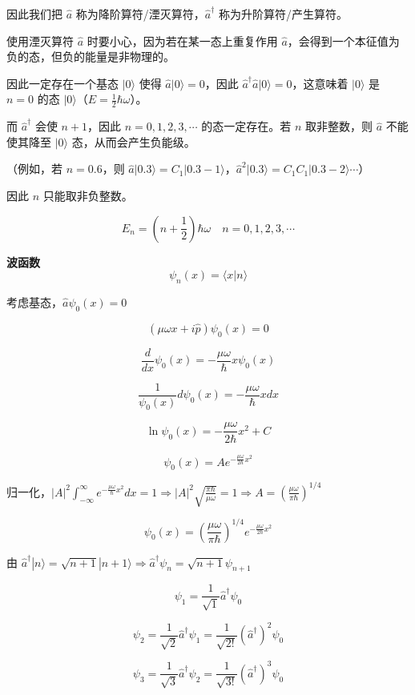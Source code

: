 \documentclass[lang=cn,10pt]{elegantbook}
\begin{document}
因此我们把 \(\hat{a}\) 称为降阶算符/湮灭算符，\(\hat{a}^\dagger\) 称为升阶算符/产生算符。

使用湮灭算符 \(\hat{a}\) 时要小心，因为若在某一态上重复作用 \(\hat{a}\)，会得到一个本征值为负的态，但负的能量是非物理的。

因此一定存在一个基态 \(|0\rangle\) 使得 \(\hat{a} |0\rangle = 0\)，因此 \(\hat{a}^\dagger \hat{a} |0\rangle = 0\)，这意味着 \(|0\rangle\) 是 \(n=0\) 的态 \(|0\rangle\)（\(E = \frac{1}{2}\hbar \omega\)）。

而 \(\hat{a}^\dagger\) 会使 \(n+1\)，因此 \(n=0, 1, 2, 3, \cdots\) 的态一定存在。若 \(n\) 取非整数，则 \(\hat{a}\) 不能使其降至 \(|0\rangle\) 态，从而会产生负能级。

（例如，若 \(n=0.6\)，则 \(\hat{a} |0.3\rangle = C_1 |0.3-1\rangle\)，\(\hat{a}^2 |0.3\rangle = C_1 C_1 |0.3-2\rangle \cdots\)）

因此 \(n\) 只能取非负整数。

\[
E_n = \left( n + \frac{1}{2} \right) \hbar \omega \quad n = 0, 1, 2, 3, \cdots
\]

\textbf{波函数}
\[
\psi_n(x) = \langle x | n \rangle
\]

考虑基态，\(\hat{a} \psi_0(x) = 0\)

\[
(\mu \omega x + i \hat{p}) \psi_0(x) = 0
\]

\[
\frac{d}{dx} \psi_0(x) = -\frac{\mu \omega}{\hbar} x \psi_0(x)
\]

\[
\frac{1}{\psi_0(x)} d\psi_0(x) = -\frac{\mu \omega}{\hbar} x dx
\]

\[
\ln \psi_0(x) = -\frac{\mu \omega}{2\hbar} x^2 + C
\]

\[
\psi_0(x) = A e^{-\frac{\mu \omega}{2\hbar} x^2}
\]

归一化，\(|A|^2 \int_{-\infty}^{\infty} e^{-\frac{\mu \omega}{\hbar} x^2} dx = 1 \Rightarrow |A|^2 \sqrt{\frac{\pi \hbar}{\mu \omega}} = 1 \Rightarrow A = \left( \frac{\mu \omega}{\pi \hbar} \right)^{1/4}\)

\[
\psi_0(x) = \left( \frac{\mu \omega}{\pi \hbar} \right)^{1/4} e^{-\frac{\mu \omega}{2\hbar} x^2}
\]

由 \(\hat{a}^\dagger |n\rangle = \sqrt{n+1} |n+1\rangle \Rightarrow \hat{a}^\dagger \psi_n = \sqrt{n+1} \psi_{n+1}\)

\[
\psi_1 = \frac{1}{\sqrt{1}} \hat{a}^\dagger \psi_0
\]

\[
\psi_2 = \frac{1}{\sqrt{2}} \hat{a}^\dagger \psi_1 = \frac{1}{\sqrt{2!}} (\hat{a}^\dagger)^2 \psi_0
\]

\[
\psi_3 = \frac{1}{\sqrt{3}} \hat{a}^\dagger \psi_2 = \frac{1}{\sqrt{3!}} (\hat{a}^\dagger)^3 \psi_0
\]
\end{document}
